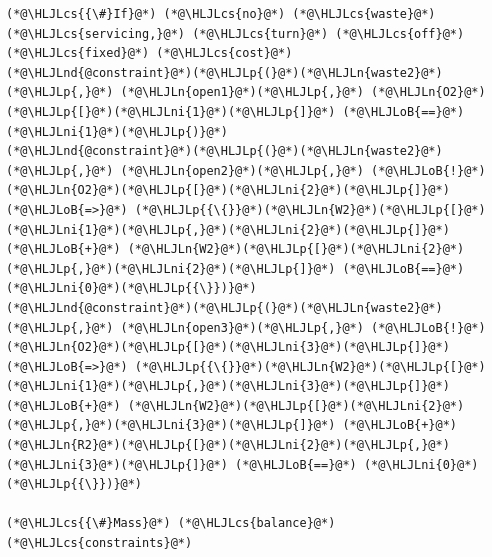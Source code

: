 \documentclass[12pt,a4paper]{article}
\newcommand{\HLJLn}[1]{#1}
\newcommand{\HLJLnd}[1]{\textcolor[RGB]{214,102,97}{#1}}
\newcommand{\HLJLni}[1]{\textcolor[RGB]{59,151,46}{#1}}
\newcommand{\HLJLoB}[1]{\textcolor[RGB]{102,102,102}{\textbf{#1}}}
\newcommand{\HLJLp}[1]{#1}
\newcommand{\HLJLcs}[1]{\textcolor[RGB]{153,153,119}{\textit{#1}}}
\begin{document}
\begin{lstlisting}
(*@\HLJLcs{{\#}If}@*) (*@\HLJLcs{no}@*) (*@\HLJLcs{waste}@*) (*@\HLJLcs{servicing,}@*) (*@\HLJLcs{turn}@*) (*@\HLJLcs{off}@*) (*@\HLJLcs{fixed}@*) (*@\HLJLcs{cost}@*)
(*@\HLJLnd{@constraint}@*)(*@\HLJLp{(}@*)(*@\HLJLn{waste2}@*)(*@\HLJLp{,}@*) (*@\HLJLn{open1}@*)(*@\HLJLp{,}@*) (*@\HLJLn{O2}@*)(*@\HLJLp{[}@*)(*@\HLJLni{1}@*)(*@\HLJLp{]}@*) (*@\HLJLoB{==}@*) (*@\HLJLni{1}@*)(*@\HLJLp{)}@*)
(*@\HLJLnd{@constraint}@*)(*@\HLJLp{(}@*)(*@\HLJLn{waste2}@*)(*@\HLJLp{,}@*) (*@\HLJLn{open2}@*)(*@\HLJLp{,}@*) (*@\HLJLoB{!}@*)(*@\HLJLn{O2}@*)(*@\HLJLp{[}@*)(*@\HLJLni{2}@*)(*@\HLJLp{]}@*) (*@\HLJLoB{=>}@*) (*@\HLJLp{{\{}}@*)(*@\HLJLn{W2}@*)(*@\HLJLp{[}@*)(*@\HLJLni{1}@*)(*@\HLJLp{,}@*)(*@\HLJLni{2}@*)(*@\HLJLp{]}@*) (*@\HLJLoB{+}@*) (*@\HLJLn{W2}@*)(*@\HLJLp{[}@*)(*@\HLJLni{2}@*)(*@\HLJLp{,}@*)(*@\HLJLni{2}@*)(*@\HLJLp{]}@*) (*@\HLJLoB{==}@*) (*@\HLJLni{0}@*)(*@\HLJLp{{\}})}@*)
(*@\HLJLnd{@constraint}@*)(*@\HLJLp{(}@*)(*@\HLJLn{waste2}@*)(*@\HLJLp{,}@*) (*@\HLJLn{open3}@*)(*@\HLJLp{,}@*) (*@\HLJLoB{!}@*)(*@\HLJLn{O2}@*)(*@\HLJLp{[}@*)(*@\HLJLni{3}@*)(*@\HLJLp{]}@*) (*@\HLJLoB{=>}@*) (*@\HLJLp{{\{}}@*)(*@\HLJLn{W2}@*)(*@\HLJLp{[}@*)(*@\HLJLni{1}@*)(*@\HLJLp{,}@*)(*@\HLJLni{3}@*)(*@\HLJLp{]}@*) (*@\HLJLoB{+}@*) (*@\HLJLn{W2}@*)(*@\HLJLp{[}@*)(*@\HLJLni{2}@*)(*@\HLJLp{,}@*)(*@\HLJLni{3}@*)(*@\HLJLp{]}@*) (*@\HLJLoB{+}@*) (*@\HLJLn{R2}@*)(*@\HLJLp{[}@*)(*@\HLJLni{2}@*)(*@\HLJLp{,}@*)(*@\HLJLni{3}@*)(*@\HLJLp{]}@*) (*@\HLJLoB{==}@*) (*@\HLJLni{0}@*)(*@\HLJLp{{\}})}@*)

(*@\HLJLcs{{\#}Mass}@*) (*@\HLJLcs{balance}@*) (*@\HLJLcs{constraints}@*)


\end{lstlisting}
\end{document}
